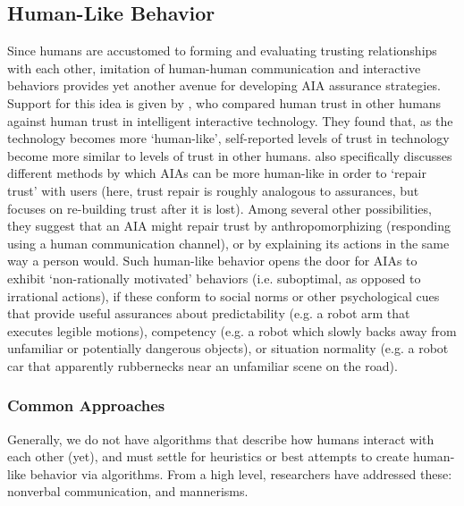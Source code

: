 \subsection{Human-Like Behavior} \label{sec:human_behavior}
Since humans are accustomed to forming and evaluating trusting relationships with each other, imitation of human-human communication and interactive behaviors provides yet another avenue for developing AIA assurance strategies. 
Support for this idea is given by \citet{Tripp2011-rx}, who compared human trust in other humans against human trust in intelligent interactive technology. %
They found that, as the technology becomes more `human-like', self-reported levels of trust in technology become more similar to levels of trust in other humans.
%
\citet{De_Visser2018-kd} also specifically discusses different methods by which AIAs can be more human-like in order to `repair trust' with users (here, trust repair is roughly analogous to assurances, but focuses on re-building trust after it is lost). Among several other possibilities, they suggest that an AIA might repair trust by anthropomorphizing (responding using a human communication channel), or by explaining its actions in the same way a person would. %
Such human-like behavior opens the door for AIAs to exhibit `non-rationally motivated' behaviors (i.e. suboptimal, as opposed to irrational actions), if these conform to social norms or other psychological cues that provide useful assurances about predictability (e.g. a robot arm that executes legible motions), competency (e.g. a robot which slowly backs away from unfamiliar or potentially dangerous objects), or situation normality (e.g. a robot car that apparently rubbernecks near an unfamiliar scene on the road). 

\subsubsection{Common Approaches}
Generally, we do not have algorithms that describe how humans interact with each other (yet), and must settle for heuristics or best attempts to create human-like behavior via algorithms. From a high level, researchers have addressed these: nonverbal communication, and mannerisms.

